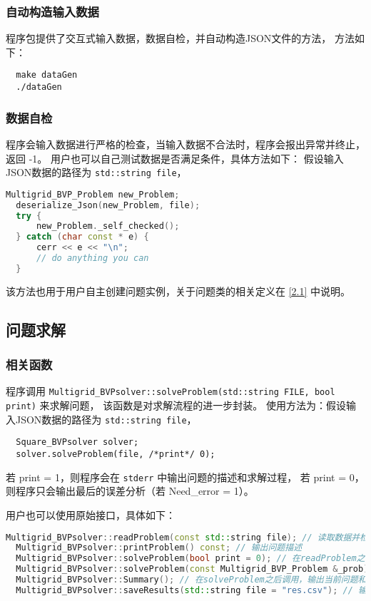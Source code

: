 \documentclass[lang=cn,a4paper,newtx,bibend=bibtex]{elegantpaper}
\begin{document}
\subsubsection{自动构造输入数据}

程序包提供了交互式输入数据，数据自检，并自动构造JSON文件的方法，
方法如下：
\begin{lstlisting}
  make dataGen
  ./dataGen
\end{lstlisting}

\subsubsection{数据自检}

程序会输入数据进行严格的检查，当输入数据不合法时，程序会报出异常并终止，返回 -1。
用户也可以自己测试数据是否满足条件，具体方法如下：
假设输入JSON数据的路径为 \lstinline{std::string file}，

\begin{lstlisting}[language=C++]
  Multigrid_BVP_Problem new_Problem;
  deserialize_Json(new_Problem, file); 
  try {
      new_Problem._self_checked();
  } catch (char const * e) {
      cerr << e << "\n";
      // do anything you can
  }
\end{lstlisting}

该方法也用于用户自主创建问题实例，关于问题类的相关定义在 \ref{2.1} 中说明。

\subsection{问题求解}

\subsubsection{相关函数}

 程序调用 \lstinline{Multigrid_BVPsolver::solveProblem(std::string FILE, bool print)} 来求解问题，
 该函数是对求解流程的进一步封装。
 使用方法为：假设输入JSON数据的路径为 \lstinline{std::string file}，
\begin{lstlisting}
  Square_BVPsolver solver;
  solver.solveProblem(file, /*print*/ 0);
\end{lstlisting}
  若 print = 1，则程序会在 \texttt{stderr} 中输出问题的描述和求解过程，
  若 print = 0，则程序只会输出最后的误差分析（若 Need\_error = 1）。

  用户也可以使用原始接口，具体如下：
\begin{lstlisting}[language=C++]
  Multigrid_BVPsolver::readProblem(const std::string file); // 读取数据并检查
  Multigrid_BVPsolver::printProblem() const; // 输出问题描述
  Multigrid_BVPsolver::solveProblem(bool print = 0); // 在readProblem之后调用，求解当前问题。
  Multigrid_BVPsolver::solveProblem(const Multigrid_BVP_Problem &_prob); // 求解已有的问题
  Multigrid_BVPsolver::Summary(); // 在solveProblem之后调用，输出当前问题和求解误差分析。
  Multigrid_BVPsolver::saveResults(std::string file = "res.csv"); // 输出问题求解结果。
\end{lstlisting}
\end{document}
